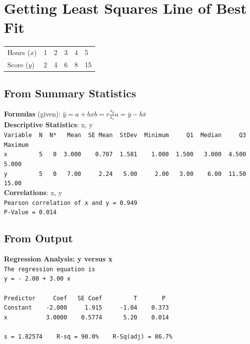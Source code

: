 \documentclass[hidelinks,9pt, oneside]{extarticle}     %
\begin{document}
\section{Getting Least Squares Line of Best Fit} %

 \begin{table}[ht]
 \centering
 \begin{tabular*}{6cm}[h]{llllll}
 Hours ($x$) & 1 & 2 & 3 & 4 & 5   \\
 Score ($y$) & 2 & 4 & 6 & 8 & 15
 \end{tabular*}
 \end{table}

\subsection{From Summary Statistics} %
\label{sub:from_summary_statistics}
{\bf Formulas} (given): $\hat{y} = a + bx$\quad\quad$b = r\frac{s_y}{s_x}$\quad\quad$a=\bar{y}-b\bar{x}$\\[.2in]
{\bf Descriptive Statistics}: x, y\\
\verb|Variable  N  N*   Mean  SE Mean  StDev  Minimum     Q1  Median     Q3  Maximum|\\
\verb|x         5   0  3.000    0.707  1.581    1.000  1.500   3.000  4.500    5.000|\\
\verb|y         5   0   7.00     2.24   5.00     2.00   3.00    6.00  11.50    15.00|\\[.1in]
{\bf Correlations}: x, y \\
\verb|Pearson correlation of x and y = 0.949|\\
\verb|P-Value = 0.014|\\[.5in]



\newpage

\subsection{From Output} %
\label{sub:from_output}

{\bf Regression Analysis: y versus x}\\
\verb|The regression equation is|\\
\verb|y = - 2.00 + 3.00 x|\\
\verb||\\
\verb|Predictor     Coef   SE Coef         T       P|\\
\verb|Constant    -2.000     1.915     -1.04    0.373|\\
\verb|x           3.0000    0.5774      5.20    0.014|\\
\verb||\\
\verb|s = 1.82574    R-sq = 90.0%    R-Sq(adj) = 86.7%|
\verb||\\
\end{document}
